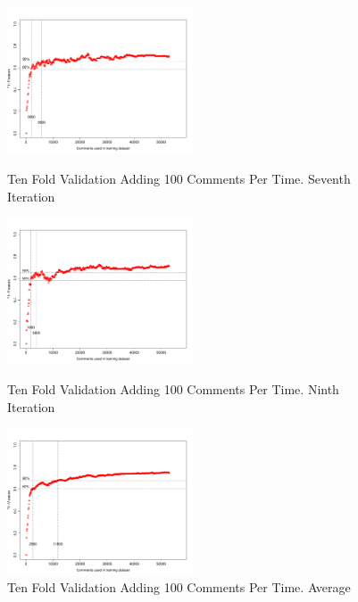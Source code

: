 \clearpage
\begin{figure}[thb!]
  \centering
  \vspace{-3mm}
  \includegraphics[width=0.49\textwidth]{figures/appendix/ten_fold_validation_requirement/ten_fold_validation_6_100.pdf}
  \vspace{-5mm}
  \caption{Ten Fold Validation Adding 100 Comments Per Time. Seventh Iteration}
  \label{fig:requirement_ten_fold_validation_6_100}
  \includegraphics[width=0.49\textwidth]{figures/appendix/ten_fold_validation_requirement/ten_fold_validation_8_100.pdf}
  \vspace{-5mm}
  \caption{Ten Fold Validation Adding 100 Comments Per Time. Ninth Iteration}
  \label{fig:requirement_ten_fold_validation_8_100}
  \includegraphics[width=0.49\textwidth]{figures/appendix/ten_fold_validation_requirement/ten_fold_validation_average_100.pdf}
  \vspace{-5mm}
  \caption{Ten Fold Validation Adding 100 Comments Per Time. Average}
  \label{fig:requirement_ten_fold_validation_average_100}
\end{figure}

